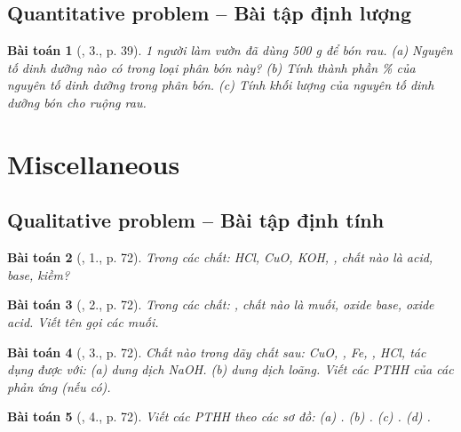 \documentclass{article}
\newtheorem{baitoan}{Bài toán}
\begin{document}
\subsection{Quantitative problem -- Bài tập định lượng}

\begin{baitoan}[\cite{SGK_Hoa_Hoc_9}, 3., p. 39]
	1 người làm vườn đã dùng \emph{500 g } để bón rau. (a) Nguyên tố dinh dưỡng nào có trong loại phân bón này? (b) Tính thành phần \% của nguyên tố dinh dưỡng trong phân bón. (c) Tính khối lượng của nguyên tố dinh dưỡng bón cho ruộng rau.
\end{baitoan}


\section{Miscellaneous}

\subsection{Qualitative problem -- Bài tập định tính}

\begin{baitoan}[\cite{SGK_KHTN_8_Canh_Dieu}, 1., p. 72]
	Trong các chất: \emph{HCl, CuO, KOH, }, chất nào là acid, base, kiềm?
\end{baitoan}

\begin{baitoan}[\cite{SGK_KHTN_8_Canh_Dieu}, 2., p. 72]
	Trong các chất: \emph{}, chất nào là muối, oxide base, oxide acid. Viết tên gọi các muối.
\end{baitoan}

\begin{baitoan}[\cite{SGK_KHTN_8_Canh_Dieu}, 3., p. 72]
	Chất nào trong dãy chất sau: \emph{CuO, , Fe, , HCl, } tác dụng được với: (a) dung dịch \emph{NaOH}. (b) dung dịch \emph{} loãng. Viết các PTHH của các phản ứng (nếu có).
\end{baitoan}

\begin{baitoan}[\cite{SGK_KHTN_8_Canh_Dieu}, 4., p. 72]
	Viết các PTHH theo các sơ đồ: (a) \emph{}. (b) \emph{}. (c) \emph{}. (d) \emph{}.
\end{baitoan}
\end{document}
